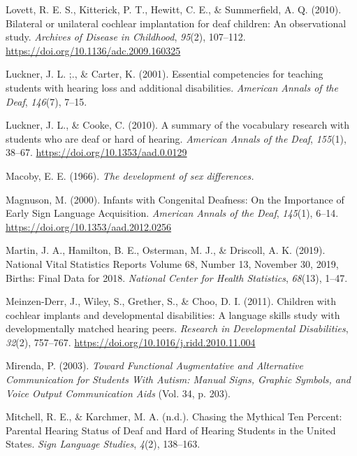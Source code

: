 \documentclass[english,man,floatsintext]{apa6}
\begin{document}
\leavevmode\hypertarget{ref-lovett2010}{}%
Lovett, R. E. S., Kitterick, P. T., Hewitt, C. E., \& Summerfield, A. Q. (2010). Bilateral or unilateral cochlear implantation for deaf children: An observational study. \emph{Archives of Disease in Childhood}, \emph{95}(2), 107--112. \url{https://doi.org/10.1136/adc.2009.160325}

\leavevmode\hypertarget{ref-luckner2001}{}%
Luckner, J. L. ;., \& Carter, K. (2001). Essential competencies for teaching students with hearing loss and additional disabilities. \emph{American Annals of the Deaf}, \emph{146}(7), 7--15.

\leavevmode\hypertarget{ref-luckner2010}{}%
Luckner, J. L., \& Cooke, C. (2010). A summary of the vocabulary research with students who are deaf or hard of hearing. \emph{American Annals of the Deaf}, \emph{155}(1), 38--67. \url{https://doi.org/10.1353/aad.0.0129}

\leavevmode\hypertarget{ref-macoby1966}{}%
Macoby, E. E. (1966). \emph{The development of sex differences.}

\leavevmode\hypertarget{ref-magnuson2000}{}%
Magnuson, M. (2000). Infants with Congenital Deafness: On the Importance of Early Sign Language Acquisition. \emph{American Annals of the Deaf}, \emph{145}(1), 6--14. \url{https://doi.org/10.1353/aad.2012.0256}

\leavevmode\hypertarget{ref-martin2019}{}%
Martin, J. A., Hamilton, B. E., Osterman, M. J., \& Driscoll, A. K. (2019). National Vital Statistics Reports Volume 68, Number 13, November 30, 2019, Births: Final Data for 2018. \emph{National Center for Health Statistics}, \emph{68}(13), 1--47.

\leavevmode\hypertarget{ref-meinzen-derr2011}{}%
Meinzen-Derr, J., Wiley, S., Grether, S., \& Choo, D. I. (2011). Children with cochlear implants and developmental disabilities: A language skills study with developmentally matched hearing peers. \emph{Research in Developmental Disabilities}, \emph{32}(2), 757--767. \url{https://doi.org/10.1016/j.ridd.2010.11.004}

\leavevmode\hypertarget{ref-mirenda2003}{}%
Mirenda, P. (2003). \emph{Toward Functional Augmentative and Alternative Communication for Students With Autism: Manual Signs, Graphic Symbols, and Voice Output Communication Aids} (Vol. 34, p. 203).

\leavevmode\hypertarget{ref-mitchell2004}{}%
Mitchell, R. E., \& Karchmer, M. A. (n.d.). Chasing the Mythical Ten Percent: Parental Hearing Status of Deaf and Hard of Hearing Students in the United States. \emph{Sign Language Studies}, \emph{4}(2), 138--163.
\end{document}
